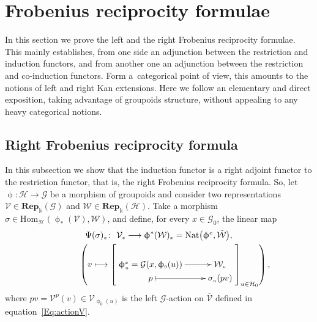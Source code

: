 \documentclass[pdftex]{sigma}
\numberwithin{equation}{section}
\renewcommand{\hom}[3]{\mathrm{Hom}_{\Sscript{#1}}\left(#2, #3\right)}
\newcommand{\bara}[1]{\overline{#1}}
\newcommand{\Rep}[1]{\mathbf{Rep}_{\Sscript{\Bbbk}}(#1)}
\newcommand{\Go}{\cG_{\Sscript{0}}}
\newcommand{\Ho}{\cH_{\Sscript{0}}}
\newcommand{\Vx}{\cV_{\Sscript{x}}}
\newcommand{\cG}{{\mathcal G}}
\newcommand{\cH}{{\mathcal H}}
\newcommand{\cV}{{\mathcal V}}
\newcommand{\cW}{{\mathcal W}}
\newcommand{\phix}{\upphi^{\Sscript{x}}}
\newcommand{\Sscript}[1]{\scriptscriptstyle{#1}}
\newcommand{\phio}{\upphi_{\Sscript{0}}}
\begin{document}
\section{Frobenius reciprocity formulae}\label{sec:FRF}
In this section we prove the left and the right Frobenius reciprocity formulae. This mainly establishes, from one side an adjunction between the restriction and induction functors, and from another one an adjunction between the restriction and co-induction functors. Form a~categorical point of view, this amounts to the notions of left and right Kan extensions. Here we follow an elementary and direct exposition, taking advantage of groupoids structure, without appealing to any heavy categorical notions.

\subsection{Right Frobenius reciprocity formula}\label{ssec:Adj}
In this subsection we show that the induction functor is a right adjoint functor to the restriction functor, that is, the right Frobenius reciprocity formula. So, let $\upphi\colon \cH \to \cG$ be a morphism of groupoids and consider two representations $\cV \in \Rep{\cG}$ and $\cW \in \Rep{\cH}$. Take a morphism $ \sigma \in \hom{\cH}{\upphi_{*}(\cV)}{\cW}$, and define, for every $x \in \Go$, the linear map
\begin{gather}
\Psi(\sigma)_{\Sscript{x}}\colon \ \Vx \longrightarrow \upphi^*(\cW)_{\Sscript{x}}={\rm Nat}\big(\phix, \tilde{\cW}\big),\nonumber\\
\hphantom{\Psi(\sigma)_{\Sscript{x}}\colon}{} \ \left( v \longmapsto \left[ \xymatrix@R=0pt{ \upphi^{\Sscript{x}}_{\Sscript{u}} =\cG(x,\phio(u)) \ar@{->}^-{}[r] & \cW_{\Sscript{u}} \\ p \ar@{|->}^-{}[r] & \sigma_{\Sscript{u}} (p v) } \right]_{u \in \Ho} \right),\label{Eq:Psigma}
\end{gather}
where $pv=\cV^{\Sscript{p}}(v) \in \cV_{\Sscript{\phio(u)}}$ is the left $\cG$-action on $\bara{\cV}$ defined in equation~\eqref{Eq:actionV}.
\end{document}
